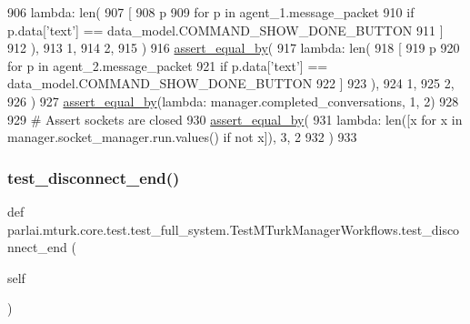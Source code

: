 \begin{DoxyCode}
906             \textcolor{keyword}{lambda}: len(
907                 [
908                     p
909                     \textcolor{keywordflow}{for} p \textcolor{keywordflow}{in} agent\_1.message\_packet
910                     \textcolor{keywordflow}{if} p.data[\textcolor{stringliteral}{'text'}] == data\_model.COMMAND\_SHOW\_DONE\_BUTTON
911                 ]
912             ),
913             1,
914             2,
915         )
916         \hyperlink{namespaceparlai_1_1mturk_1_1core_1_1test_1_1test__full__system_a0b463246d35658a2e422010f13dcf819}{assert\_equal\_by}(
917             \textcolor{keyword}{lambda}: len(
918                 [
919                     p
920                     \textcolor{keywordflow}{for} p \textcolor{keywordflow}{in} agent\_2.message\_packet
921                     \textcolor{keywordflow}{if} p.data[\textcolor{stringliteral}{'text'}] == data\_model.COMMAND\_SHOW\_DONE\_BUTTON
922                 ]
923             ),
924             1,
925             2,
926         )
927         \hyperlink{namespaceparlai_1_1mturk_1_1core_1_1test_1_1test__full__system_a0b463246d35658a2e422010f13dcf819}{assert\_equal\_by}(\textcolor{keyword}{lambda}: manager.completed\_conversations, 1, 2)
928 
929         \textcolor{comment}{# Assert sockets are closed}
930         \hyperlink{namespaceparlai_1_1mturk_1_1core_1_1test_1_1test__full__system_a0b463246d35658a2e422010f13dcf819}{assert\_equal\_by}(
931             \textcolor{keyword}{lambda}: len([x \textcolor{keywordflow}{for} x \textcolor{keywordflow}{in} manager.socket\_manager.run.values() \textcolor{keywordflow}{if} \textcolor{keywordflow}{not} x]), 3, 2
932         )
933 
\end{DoxyCode}
\mbox{\label{classparlai_1_1mturk_1_1core_1_1test_1_1test__full__system_1_1TestMTurkManagerWorkflows_a8af4ec1e17ef7dc37903d839ff4882f0}} 
\subsubsection{\texorpdfstring{test\+\_\+disconnect\+\_\+end()}{test\_disconnect\_end()}}
{\footnotesize\ttfamily def parlai.\+mturk.\+core.\+test.\+test\+\_\+full\+\_\+system.\+Test\+M\+Turk\+Manager\+Workflows.\+test\+\_\+disconnect\+\_\+end (\begin{DoxyParamCaption}\item[{}]{self }\end{DoxyParamCaption})}



